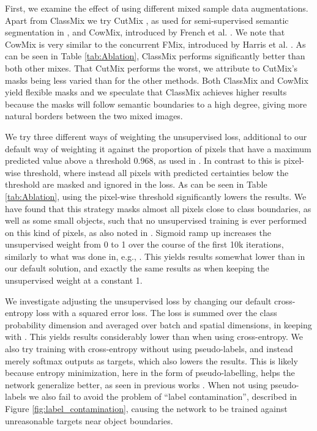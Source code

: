 \documentclass[10pt,twocolumn,letterpaper]{article}
\begin{document}
First, we examine the effect of using different mixed sample data augmentations. Apart from ClassMix we try CutMix \cite{CutMix}, as used for semi-supervised semantic segmentation in \cite{French}, and CowMix, introduced by French et al. \cite{MilkingCowMask}. We note that CowMix is very similar to the concurrent FMix, introduced by Harris et al. \cite{harris2020understanding}. As can be seen in Table \ref{tab:Ablation}, ClassMix performs significantly better than both other mixes. That CutMix performs the worst, we attribute to CutMix's masks being less varied than for the other methods. Both ClassMix and CowMix yield flexible masks and we speculate that ClassMix achieves higher results because the masks will follow semantic boundaries to a high degree, giving more natural borders between the two mixed images.

We try three different ways of weighting the unsupervised loss, additional to our default way of weighting it against the proportion of pixels that have a maximum predicted value above a threshold 0.968, as used in \cite{French}. In contrast to this is pixel-wise threshold, where instead all pixels with predicted certainties below the threshold are masked and ignored in the loss. As can be seen in Table \ref{tab:Ablation}, using the pixel-wise threshold significantly lowers the results. We have found that this strategy masks almost all pixels close to class boundaries, as well as some small objects, such that no unsupervised training is ever performed on this kind of pixels, as also noted in \cite{French}.
Sigmoid ramp up increases the unsupervised weight  from 0 to 1 over the course of the first 10k iterations, similarly to what was done in, e.g., \cite{TarvainenMeanTeacher,LaineTemporalEnsembling}. This yields results somewhat lower than in our default solution, and exactly the same results as when keeping the unsupervised weight at a constant 1.

We investigate adjusting the unsupervised loss by changing our default cross-entropy loss with a squared error loss. The loss is summed over the class probability dimension and averaged over batch and spatial dimensions, in keeping with \cite{French}. This yields results considerably lower than when using cross-entropy. 
We also try training with cross-entropy without using pseudo-labels, and instead merely softmax outputs as targets, which also lowers the results. This is likely because entropy minimization, here in the form of pseudo-labelling, helps the network generalize better, as seen in previous works \cite{FixMatch,pseudo-label}. When not using pseudo-labels we also fail to avoid the problem of ``label contamination'', described in Figure \ref{fig:label_contamination}, causing the network to be trained against unreasonable targets near object boundaries.
\end{document}
